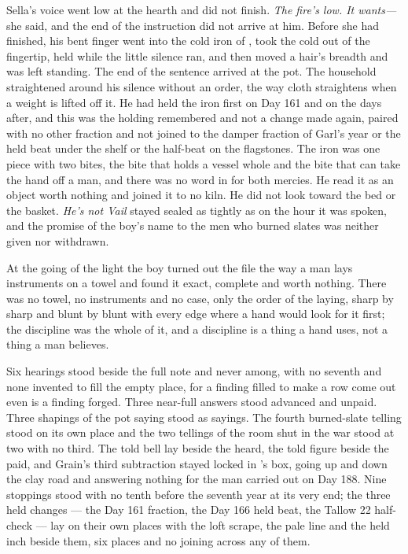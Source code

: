 Sella's voice went low at the hearth and did not finish. \emph{The fire's low. It wants---} she said, and the end of the instruction did not arrive at him. Before she had finished, his bent finger went into the cold iron of , took the cold out of the fingertip, held while the little silence ran, and then moved a hair's breadth and was left standing. The end of the sentence arrived at the pot. The household straightened around his silence without an order, the way cloth straightens when a weight is lifted off it. He had held the iron first on Day 161 and on the days after, and this was the holding remembered and not a change made again, paired with no other fraction and not joined to the damper fraction of Garl's year or the held beat under the shelf or the half-beat on the flagstones. The iron was one piece with two bites, the bite that holds a vessel whole and the bite that can take the hand off a man, and there was no word in  for both mercies. He read it as an object worth nothing and joined it to no kiln. He did not look toward the bed or the basket. \emph{He's not Vail} stayed sealed as tightly as on the hour it was spoken, and the promise of the boy's name to the men who burned slates was neither given nor withdrawn.

\scenebreak

At the going of the light the boy turned out the file the way a man lays instruments on a towel and found it exact, complete and worth nothing. There was no towel, no instruments and no case, only the order of the laying, sharp by sharp and blunt by blunt with every edge where a hand would look for it first; the discipline was the whole of it, and a discipline is a thing a hand uses, not a thing a man believes.

Six hearings stood beside the full note and never among, with no seventh and none invented to fill the empty place, for a finding filled to make a row come out even is a finding forged. Three near-full answers stood advanced and unpaid. Three shapings of the pot saying stood as sayings. The fourth burned-slate telling stood on its own place and the two tellings of the room shut in the war stood at two with no third. The told bell lay beside the heard, the told figure beside the paid, and Grain's third subtraction stayed locked in 's box, going up and down the clay road and answering nothing for the man carried out on Day 188. Nine stoppings stood with no tenth before the seventh year at its very end; the three held changes --- the Day 161 fraction, the Day 166 held beat, the Tallow 22 half-check --- lay on their own places with the loft scrape, the pale line and the held inch beside them, six places and no joining across any of them.

